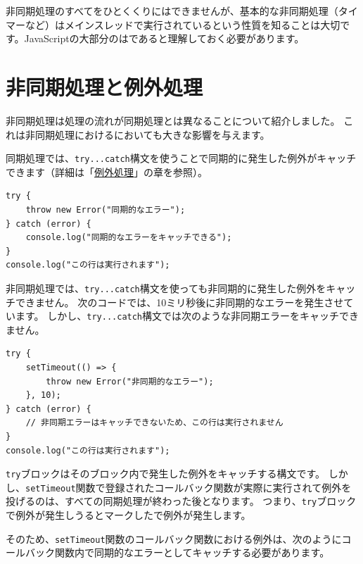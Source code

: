 非同期処理のすべてをひとくくりにはできませんが、基本的な非同期処理（タイマーなど）はメインスレッドで実行されているという性質を知ることは大切です。JavaScriptの大部分の\textbf{}は\textbf{}であると理解しておく必要があります。

\hypertarget{async-processing-and-error-handling}{%
\section{非同期処理と例外処理}\label{async-processing-and-error-handling}}

非同期処理は処理の流れが同期処理とは異なることについて紹介しました。
これは非同期処理における\textbf{}においても大きな影響を与えます。

同期処理では、\texttt{try...catch}構文を使うことで同期的に発生した例外がキャッチできます（詳細は「\hyperlink{error-handling}{例外処理}」の章を参照）。

\begin{lstlisting}
try {
    throw new Error("同期的なエラー");
} catch (error) {
    console.log("同期的なエラーをキャッチできる");
}
console.log("この行は実行されます");
\end{lstlisting}

非同期処理では、\texttt{try...catch}構文を使っても非同期的に発生した例外をキャッチできません。
次のコードでは、10ミリ秒後に非同期的なエラーを発生させています。
しかし、\texttt{try...catch}構文では次のような非同期エラーをキャッチできません。

\begin{lstlisting}
try {
    setTimeout(() => {
        throw new Error("非同期的なエラー");
    }, 10);
} catch (error) {
    // 非同期エラーはキャッチできないため、この行は実行されません
}
console.log("この行は実行されます");
\end{lstlisting}

\texttt{try}ブロックはそのブロック内で発生した例外をキャッチする構文です。
しかし、\texttt{setTimeout}関数で登録されたコールバック関数が実際に実行されて例外を投げるのは、すべての同期処理が終わった後となります。
つまり、\texttt{try}ブロックで例外が発生しうるとマークした\textbf{}で例外が発生します。

そのため、\texttt{setTimeout}関数のコールバック関数における例外は、次のようにコールバック関数内で同期的なエラーとしてキャッチする必要があります。

